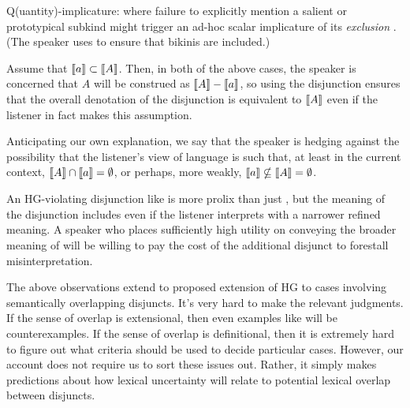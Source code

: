\documentclass{article}
\begin{document}
\begin{examples}
\begin{examples}
  \item Q(uantity)-implicature: where failure to explicitly mention a
    salient or prototypical subkind might trigger an ad-hoc scalar
    implicature of its \emph{exclusion} \citep{hirschberg:1985}. (The
    speaker uses  to ensure that bikinis are
    included.)
  \end{examples}

\item Assume that $\llbracket a\rrbracket \subset \llbracket A\rrbracket$. Then, in both of the
  above cases, the speaker is concerned that $A$ will be construed as
  $\llbracket A\rrbracket-\llbracket a\rrbracket$, so using the disjunction ensures that the overall
  denotation of the disjunction is equivalent to $\llbracket A\rrbracket$ even if the
  listener in fact makes this assumption.

\item Anticipating our own explanation, we say that the speaker is
  hedging against the possibility that the listener's view of language
  is such that, at least in the current context, $\llbracket A\rrbracket \cap \llbracket a\rrbracket
  = \emptyset$, or perhaps, more weakly, $ \llbracket a\rrbracket \nsubseteq \llbracket A\rrbracket
  = \emptyset$.

\item An HG-violating disjunction like  is more
  prolix than just , but the meaning of the disjunction
  includes  even if the listener interprets 
  with a narrower refined meaning.  A speaker who places sufficiently
  high utility on conveying the broader meaning of  will be
  willing to pay the cost of the additional disjunct to forestall
  misinterpretation.

\item The above observations extend to  proposed
  extension of HG to cases involving semantically overlapping
  disjuncts. It's very hard to make the relevant judgments.  If the
  sense of overlap is extensional, then even examples like
   will be counterexamples. If the sense of
  overlap is definitional, then it is extremely hard to figure out
  what criteria should be used to decide particular cases. However,
  our account does not require us to sort these issues out. Rather, it
  simply makes predictions about how lexical uncertainty will relate
  to potential lexical overlap between disjuncts.
\end{examples}
 
\end{document}
